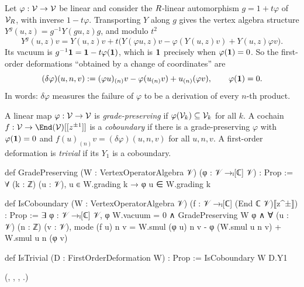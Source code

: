 Let $\varphi:\mathcal{V}\to\mathcal{V}$ be linear and consider the $R$-linear automorphism $g = 1+t\varphi$
of $\mathcal{V}_R$, with inverse $1-t\varphi$. Transporting $Y$ along $g$ gives the vertex algebra
structure $Y^g(u,z) = g^{-1}Y(gu,z)g$, and modulo $t^2$
\begin{equation*}
 Y^g(u,z)v = Y(u,z)v + t\big(Y(\varphi u,z)v - \varphi(Y(u,z)v) + Y(u,z)\varphi v\big).
\end{equation*}
Its vacuum is $g^{-1}\mathbf{1} = \mathbf{1} - t\varphi(\mathbf{1})$, which is $\mathbf{1}$ precisely when
$\varphi(\mathbf{1}) = 0$. So the first-order deformations ``obtained by a change of coordinates'' are
\begin{equation}\label{l07:eq:delta}
 (\delta\varphi)(u,n,v) := (\varphi u)_{(n)}v - \varphi(u_{(n)}v) + u_{(n)}(\varphi v),
 \qquad \varphi(\mathbf{1}) = 0 .
\end{equation}
In words: $\delta\varphi$ measures the failure of $\varphi$ to be a derivation of every $n$-th
product.

\begin{definition}\label{l07:def:trivial}
A linear map $\varphi:\mathcal{V}\to\mathcal{V}$ is \emph{grade-preserving} if $\varphi(\mathcal{V}_k)\subseteq\mathcal{V}_k$
for all $k$. A cochain $f:\lsevenV\to\End(\lsevenV)[[z^{\pm1}]]$ is a \emph{coboundary} if there is a
grade-preserving $\varphi$ with $\varphi(\mathbf{1}) = 0$ and $f(u)_{(n)}v = (\delta\varphi)(u,n,v)$ for
all $u,n,v$. A first-order deformation is \emph{trivial} if its $Y_1$ is a coboundary.
\end{definition}
\begin{leancode}
def GradePreserving (W : VertexOperatorAlgebra 𝒱) (φ : 𝒱 →ₗ[ℂ] 𝒱) : Prop :=
  ∀ (k : ℤ) (u : 𝒱), u ∈ W.grading k → φ u ∈ W.grading k

def IsCoboundary (W : VertexOperatorAlgebra 𝒱) (f : 𝒱 →ₗ[ℂ] (End ℂ 𝒱)⟦z^±⟧) : Prop :=
  ∃ φ : 𝒱 →ₗ[ℂ] 𝒱, φ W.vacuum = 0 ∧ GradePreserving W φ ∧
    ∀ (u : 𝒱) (n : ℤ) (v : 𝒱),
      mode (f u) n v = W.smul (φ u) n v - φ (W.smul u n v) + W.smul u n (φ v)

def IsTrivial (D : FirstOrderDeformation W) : Prop := IsCoboundary W D.Y1
\end{leancode}
(, ,
, .)

